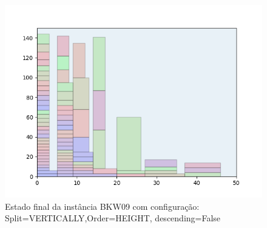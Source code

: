 \begin{figure}[H]
    \centering
    \caption[]{Estado final da instância BKW09 com configuração: Split=VERTICALLY,Order=HEIGHT, descending=False}
    \label{fig:bkw09-vertically-height-false}
    \includegraphics[scale=0.5]{output/figures/bkw/bkw09/vertically/height/false/000}
\end{figure}